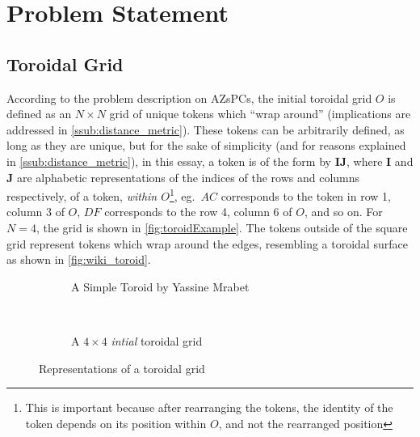 \section{Problem Statement}%
\label{sec:problem_statement}

\subsection{Toroidal Grid}%
\label{sub:toroidal_grid}


According to the problem description on AZsPCs,\cite{zimmermann} the initial toroidal grid $O$ is defined as an $N\times N$ grid of unique tokens which ``wrap around'' (implications are addressed in \ref{ssub:distance_metric}). These tokens can be arbitrarily defined, as long as they are unique, but for the sake of simplicity (and for reasons explained in \ref{ssub:distance_metric}), in this essay, a token is of the form by $\bm{IJ}$, where $\bm{I}$ and $\bm{J}$ are alphabetic representations of the indices of the rows and columns respectively, of a token, \emph{within $O$}\footnote{This is important because after rearranging the tokens, the identity of the token depends on its position within $O$, and not the rearranged position}, eg.~$AC$ corresponds to the token in row 1, column 3 of $O$, $DF$ corresponds to the row 4, column 6 of $O$, and so on. For $N=4$, the grid is shown in \autoref{fig:toroidExample}. The tokens outside of the square grid represent tokens which wrap around the edges, resembling a toroidal surface as shown in \autoref{fig:wiki_toroid}.
\begin{figure}[htpb]
    \begin{subfigure}[t]{0.5\textwidth}
    \begin{center}
    \caption{A Simple Toroid by Yassine Mrabet\cite{wiki_toroid}}
    \label{fig:wiki_toroid}
    \end{center}
    \end{subfigure}
    ~
    \begin{subfigure}[t]{0.5\textwidth}
    \begin{center}
    \caption{A $4\times 4$ \emph{intial} toroidal grid}%
    \label{fig:toroidExample}
    \end{center}
    \end{subfigure}
    \caption{Representations of a toroidal grid}
\end{figure}


